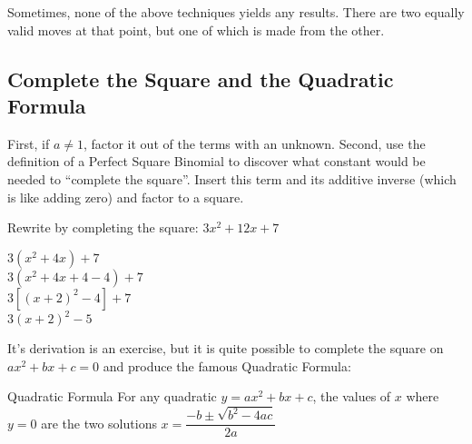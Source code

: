 Sometimes, none of the above techniques yields any results.  There are two equally valid
moves at that point, but one of which is made from the other.

\subsection{Complete the Square and the Quadratic Formula}
First, if $a\ne1$, factor it out of the terms with an unknown.  
Second, use the definition of a Perfect Square Binomial
to discover what constant would be needed to ``complete the square''.  Insert this term and its
additive inverse (which is like adding zero) and factor to a square.

\begin{example}
\exProblem
Rewrite by completing the square: $3x^2 + 12x + 7$

\exSolution
$3(x^2+4x) + 7$\\
$3(x^2+4x+4-4) + 7$\\
$3[(x+2)^2-4] + 7$\\
$3(x+2)^2-5$
\end{example}

It's derivation is an exercise, but it is quite possible to complete the square on $ax^2+bx+c=0$ 
and produce the famous Quadratic Formula:

\begin{derivation}{Quadratic Formula}
For any quadratic $y=ax^2+bx+c$, the values of $x$ where $y=0$ are the two solutions
$x=\dfrac{-b\pm\sqrt{b^2-4ac}}{2a}$
\end{derivation}



